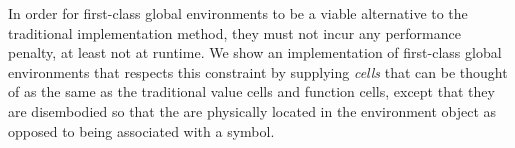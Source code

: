 In order for first-class global environments to be a viable
alternative to the traditional implementation method, they must not
incur any performance penalty, at least not at runtime.  We show an
implementation of first-class global environments that respects this
constraint by supplying \emph{cells} that can be thought of as the
same as the traditional value cells and function cells, except that
they are disembodied so that the are physically located in the
environment object as opposed to being associated with a symbol.

